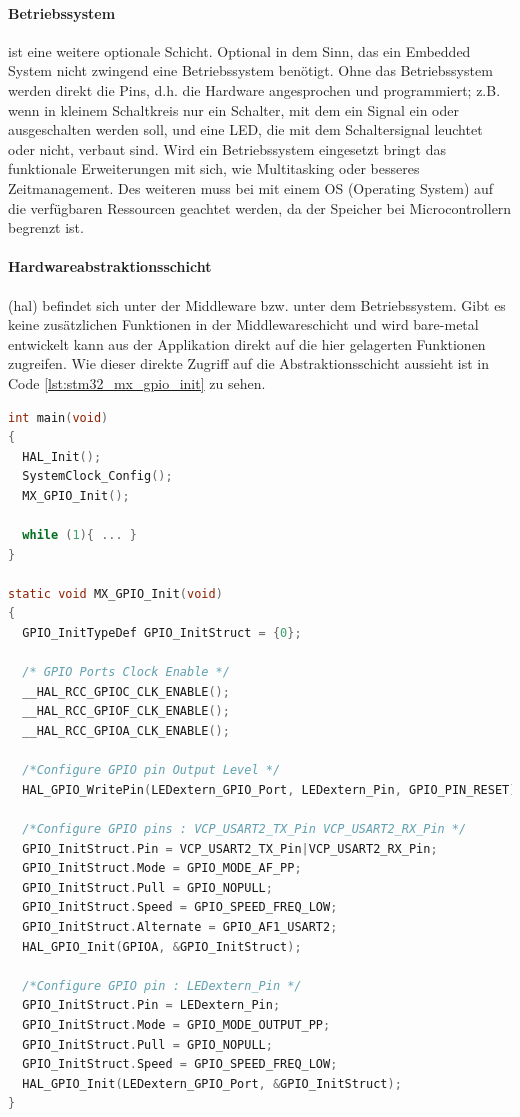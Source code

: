 \paragraph{Betriebssystem} ist eine weitere optionale Schicht.
Optional in dem Sinn, das ein Embedded System nicht zwingend eine Betriebssystem benötigt.
Ohne das Betriebssystem werden direkt die Pins, d.h. die Hardware angesprochen und programmiert; z.B. wenn in kleinem Schaltkreis nur ein Schalter, mit dem ein Signal ein oder ausgeschalten werden soll, und eine LED, die mit dem Schaltersignal leuchtet oder nicht, verbaut sind.
Wird ein Betriebssystem eingesetzt bringt das funktionale Erweiterungen mit sich, wie Multitasking oder besseres Zeitmanagement.
Des weiteren muss bei mit einem OS (Operating System) auf die verfügbaren Ressourcen geachtet werden, da der Speicher bei Microcontrollern begrenzt ist.

\paragraph{Hardwareabstraktionsschicht} (\gls{hal}) befindet sich unter der Middleware bzw. unter dem Betriebssystem.
Gibt es keine zusätzlichen Funktionen in der Middlewareschicht und wird bare-metal entwickelt kann aus der Applikation direkt auf die hier gelagerten Funktionen zugreifen.
Wie dieser direkte Zugriff auf die Abstraktionsschicht aussieht ist in Code \ref{lst:stm32_mx_gpio_init} %
zu sehen.

\begin{lstlisting}[language=C, caption={Funktion zur Initialisierung der GPIO-Pins aus einem STM32-Projekt.}, label={lst:stm32_mx_gpio_init}]
int main(void)
{
  HAL_Init();
  SystemClock_Config();
  MX_GPIO_Init();
  
  while (1){ ... } 
}

static void MX_GPIO_Init(void)
{
  GPIO_InitTypeDef GPIO_InitStruct = {0};

  /* GPIO Ports Clock Enable */
  __HAL_RCC_GPIOC_CLK_ENABLE();
  __HAL_RCC_GPIOF_CLK_ENABLE();
  __HAL_RCC_GPIOA_CLK_ENABLE();

  /*Configure GPIO pin Output Level */
  HAL_GPIO_WritePin(LEDextern_GPIO_Port, LEDextern_Pin, GPIO_PIN_RESET);

  /*Configure GPIO pins : VCP_USART2_TX_Pin VCP_USART2_RX_Pin */
  GPIO_InitStruct.Pin = VCP_USART2_TX_Pin|VCP_USART2_RX_Pin;
  GPIO_InitStruct.Mode = GPIO_MODE_AF_PP;
  GPIO_InitStruct.Pull = GPIO_NOPULL;
  GPIO_InitStruct.Speed = GPIO_SPEED_FREQ_LOW;
  GPIO_InitStruct.Alternate = GPIO_AF1_USART2;
  HAL_GPIO_Init(GPIOA, &GPIO_InitStruct);

  /*Configure GPIO pin : LEDextern_Pin */
  GPIO_InitStruct.Pin = LEDextern_Pin;
  GPIO_InitStruct.Mode = GPIO_MODE_OUTPUT_PP;
  GPIO_InitStruct.Pull = GPIO_NOPULL;
  GPIO_InitStruct.Speed = GPIO_SPEED_FREQ_LOW;
  HAL_GPIO_Init(LEDextern_GPIO_Port, &GPIO_InitStruct);
}
\end{lstlisting}

